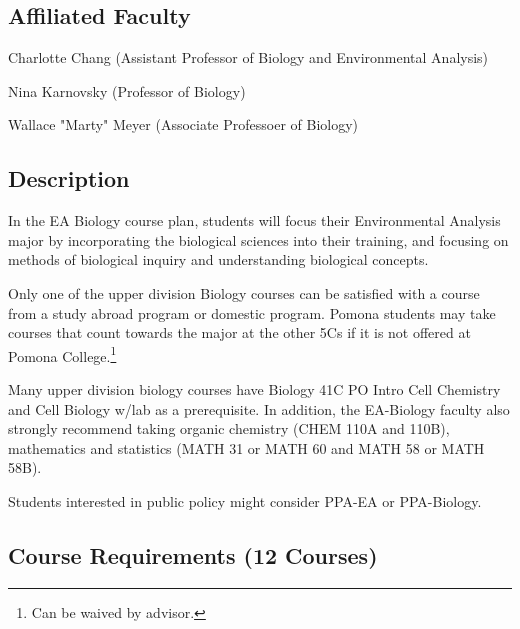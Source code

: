 \documentclass{article}\usepackage[]{graphicx}\usepackage[]{xcolor}
\newenvironment{itemize*}%
  {\begin{itemize}%
    \setlength{\itemsep}{0pt}%
    \setlength{\parskip}{0pt}}%
  {\end{itemize}}
\begin{document}
\subsection{Affiliated Faculty}

\begin{itemize*}
  \item Charlotte Chang (Assistant Professor of Biology and Environmental Analysis)
  \item Nina Karnovsky (Professor of Biology)
  \item Wallace "Marty" Meyer (Associate Professoer of Biology)
\end{itemize*}

\subsection{Description}

In the EA Biology course plan, students will focus their Environmental Analysis major by incorporating the biological sciences into their training, and focusing on methods of biological inquiry and understanding biological concepts.

Only one of the upper division Biology courses can be satisfied with a course from a study abroad program or domestic program. Pomona students may take courses that count towards the major at the other 5Cs if it is not offered at Pomona College.\footnote{Can be waived by advisor.} 

Many upper division biology courses have Biology 41C PO Intro Cell Chemistry and Cell Biology w/lab as a prerequisite. In addition, the EA-Biology faculty also strongly recommend taking organic chemistry (CHEM 110A and 110B), mathematics and statistics (MATH 31 or MATH 60 and MATH 58 or MATH 58B). 

Students interested in public policy might consider PPA-EA or PPA-Biology. 

\subsection{Course Requirements (12 Courses)}
\end{document}
